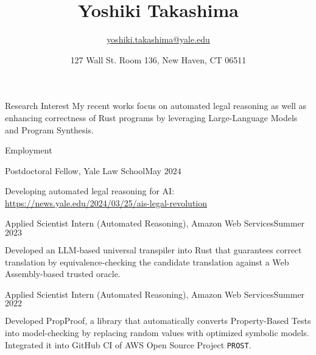\documentclass{resume} %
\title{\bf Yoshiki Takashima}
\author{\href{yoshiki.takashima@yale.edu}{yoshiki.takashima@yale.edu}}
\date{127 Wall St. Room 136, New Haven, CT 06511}
\begin{document}
\maketitle

\begin{rSection}{Research Interest}
  My recent works focus on automated legal reasoning as well as
  enhancing correctness of Rust programs by leveraging Large-Language
  Models and Program Synthesis.
\end{rSection}

\begin{rSection}{Employment}
  \begin{rSubsection}{Postdoctoral Fellow, Yale Law School}{May $2024$} {}{}
  \item Developing automated legal reasoning for AI:
    \href{https://news.yale.edu/2024/03/25/ais-legal-revolution}{
      https://news.yale.edu/2024/03/25/ais-legal-revolution}
  \end{rSubsection}


  \begin{rSubsection}{Applied Scientist Intern (Automated Reasoning),
      Amazon Web Services}{Summer $2023$} {}{}
  \item Developed an LLM-based universal transpiler into Rust that
    guarantees correct translation by equivalence-checking the
    candidate translation against a Web Assembly-based trusted oracle.
  \end{rSubsection}

  \begin{rSubsection}{Applied Scientist Intern (Automated Reasoning),
      Amazon Web Services}{Summer $2022$} {}{}
  \item Developed PropProof, a library that automatically converts
    Property-Based Tests into model-checking by replacing
    random values with optimized symbolic models. Integrated it into
    GitHub CI of AWS Open Source Project \texttt{PROST}.
  \end{rSubsection}
\end{rSection}
\end{document}
